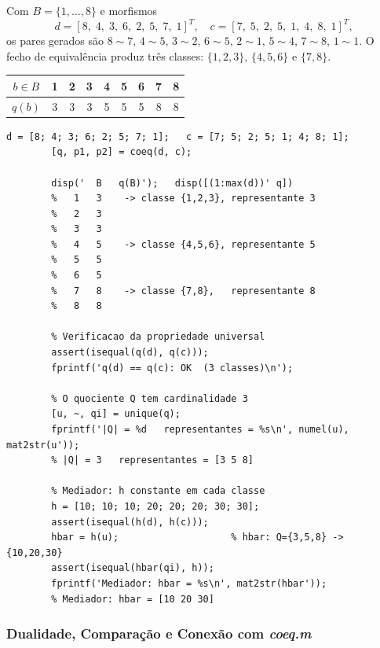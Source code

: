 \begin{example}
	\label{ex:coeq3}
	Com $B = \{1,\ldots,8\}$ e morfismos
	\[
	d = [8,\;4,\;3,\;6,\;2,\;5,\;7,\;1]^T,\quad
	c = [7,\;5,\;2,\;5,\;1,\;4,\;8,\;1]^T,
	\]
	os pares gerados são $8\!\sim\!7$, $4\!\sim\!5$, $3\!\sim\!2$,
	$6\!\sim\!5$, $2\!\sim\!1$, $5\!\sim\!4$, $7\!\sim\!8$, $1\!\sim\!1$.
	O fecho de equivalência produz três classes:
	$\{1,2,3\}$, $\{4,5,6\}$ e $\{7,8\}$.
	
	\medskip
	\begin{center}
		\begin{tabular}{ccccccccc}
			\toprule
			$b \in B$  & 1 & 2 & 3 & 4 & 5 & 6 & 7 & 8 \\
			\midrule
			$q(b)$     & 3 & 3 & 3 & 5 & 5 & 5 & 8 & 8 \\
			\bottomrule
		\end{tabular}
	\end{center}
	\medskip
	
	\begin{lstlisting}[style=matlab, caption={Exemplo 3 de \texttt{coeq.m} --- três classes}]
		d = [8; 4; 3; 6; 2; 5; 7; 1];   c = [7; 5; 2; 5; 1; 4; 8; 1];
		[q, p1, p2] = coeq(d, c);
		
		disp('  B   q(B)');   disp([(1:max(d))' q])
		%   1   3    -> classe {1,2,3}, representante 3
		%   2   3
		%   3   3
		%   4   5    -> classe {4,5,6}, representante 5
		%   5   5
		%   6   5
		%   7   8    -> classe {7,8},   representante 8
		%   8   8
		
		% Verificacao da propriedade universal
		assert(isequal(q(d), q(c)));
		fprintf('q(d) == q(c): OK  (3 classes)\n');
		
		% O quociente Q tem cardinalidade 3
		[u, ~, qi] = unique(q);
		fprintf('|Q| = %d   representantes = %s\n', numel(u), mat2str(u'));
		% |Q| = 3   representantes = [3 5 8]
		
		% Mediador: h constante em cada classe
		h = [10; 10; 10; 20; 20; 20; 30; 30];
		assert(isequal(h(d), h(c)));
		hbar = h(u);                    % hbar: Q={3,5,8} -> {10,20,30}
		assert(isequal(hbar(qi), h));
		fprintf('Mediador: hbar = %s\n', mat2str(hbar'));
		% Mediador: hbar = [10 20 30]
	\end{lstlisting}
\end{example}

\subsubsection{Dualidade, Comparação e Conexão com \emph{coeq.m}}

